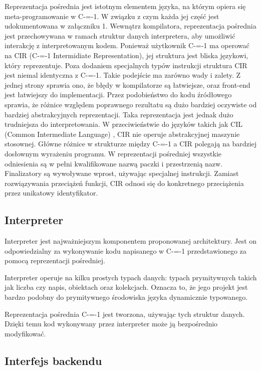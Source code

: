 \documentclass[conference]{IEEEtran}
\begin{document}
Reprezentacja pośrednia jest istotnym elementem języka, na którym opiera się meta-programowanie w C-=-1. W związku z czym każda jej część jest udokumentowana w załączniku 1. Wewnątrz kompilatora, reprezentacja pośrednia jest przechowywana w ramach struktur danych interpretera, aby umożliwić interakcję z interpretowanym kodem.
Ponieważ użytkownik C-=-1 ma operować na CIR (C-=-1 Intermidiate Representation), jej struktura jest bliska językowi, który reprezentuje. Poza dodaniem specjalnych typów instrukcji struktura CIR jest niemal identyczna z C-=-1. Takie podejście ma zarówno wady i zalety. 
Z jednej strony sprawia ono, że błędy w kompilatorze są łatwiejsze, oraz front-end jest łatwiejszy do implementacji. Przez podobieństwo do kodu źródłowego sprawia, że różnice względem poprawnego rezultatu są dużo bardziej oczywiste od bardziej abstrakcyjnych reprezentacji.
Taka reprezentacja jest jednak dużo trudniejsza do interpretowania. W przeciwieństwie do języków takich jak CIL (Common Intermediate Language) \cite{CLI}, CIR nie operuje abstrakcyjnej maszynie stosownej.
Główne różnice w strukturze między C-=-1 a CIR polegają na bardziej dosłownym wyrażeniu programu. W reprezentacji pośredniej wszystkie odniesienia są w pełni kwalifikowane nazwą paczki i przestrzenią nazw. Finalizatory są wywoływane wprost, używając specjalnej instrukcji. Zamiast rozwiązywania przeciążeń funkcji, CIR odnosi się do konkretnego przeciążenia przez unikatowy identyfikator.


\subsection{Interpreter}

Interpreter jest najważniejszym komponentem proponowanej architektury.
Jest on odpowiedzialny za wykonywanie kodu napisanego w C-=-1 przedstawionego za pomocą reprezentacji pośredniej.

Interpreter operuje na kilku prostych typach danych: typach prymitywnych takich jak liczba czy napis, obiektach oraz kolekcjach.
Oznacza to, że jego projekt jest bardzo podobny do prymitywnego środowiska języka dynamicznie typowanego.

Reprezentacja pośrednia C-=-1 jest tworzona, używając tych struktur danych.
Dzięki temu kod wykonywany przez interpreter może ją bezpośrednio modyfikować.


\subsection{Interfejs backendu}
\end{document}

